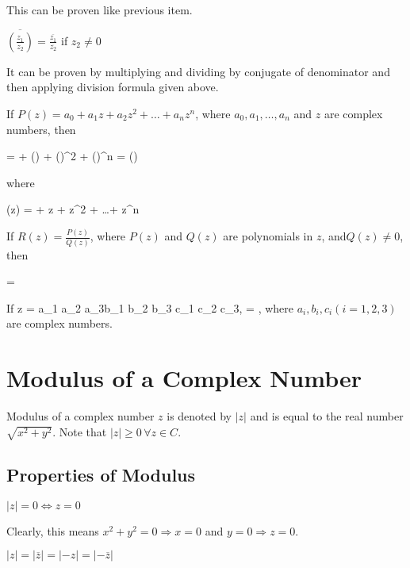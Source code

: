   This can be proven like previous item.
\item $\overline{\left(\frac{z_1}{z_2}\right)} = \frac{\overline{z_1}}{\overline{z_2}}$ if $z_2\neq 0$

  It can be proven by multiplying and dividing by conjugate of denominator and then applying division formula given above.
\item If $P(z) = a_0 + a_1z + a_2z^2 + \ldots + a_nz^n$, where $a_0, a_1, \ldots, a_n$ and $z$ are complex numbers, then

  \startformula {} =  + () + ()^2 +
  ()^n = ()\stopformula

  where

  \startformula {}(z) =  + z + z^2 + \ldots + z^n\stopformula
\item If $R(z) = \frac{P(z)}{Q(z)}$, where $P(z)$ and $Q(z)$ are polynomials in $z$, and$Q(z) \neq 0$, then

  \startformula {} = \stopformula
\item If \startformula z = \startdeterminant \NC a_1 \NC a_2 \NC a_3\NR \NC b_1 \NC b_2 \NC b_3 \NR \NC c_1 \NC c_2 \NC c_3\NR\stopdeterminant, 
  = \startdeterminant\NC{} \NC {} \NC {}\NR\NC {} \NC {} \NC {}
    \NR \NC{} \NC {} \NC {}\NR\stopdeterminant,\stopformula
  where $a_i, b_i, c_i(i = 1,2,3)$ are complex numbers.
\stopitemize

\section{Modulus of a Complex Number}
Modulus of a complex number $z$ is denoted by $|z|$ and is equal to the real number $\sqrt{x^2 + y^2}$. Note that $|z| \geq
0\,\forall z \in C$.
\subsection{Properties of Modulus}
\startitemize[n]
\item $|z| = 0 \Leftrightarrow z = 0$

  Clearly, this means $x^2 + y^2 = 0 \Rightarrow x = 0$ and $y = 0 \Rightarrow z = 0$.
\item $|z| = |\overline{z}| = |-z| = |-\overline{z}|$

